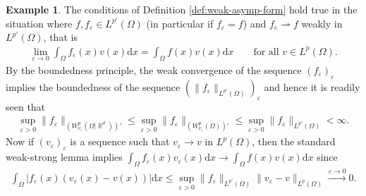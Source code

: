 \documentclass[12pt, reqno]{amsart}%
\theoremstyle{plain}  %
\theoremstyle{definition}  %
\newtheorem{example}[theorem]{Example}
\numberwithin{equation}{section}
\DeclareMathOperator{\R}{\mathbb{R}}
\renewcommand{\d}{\mathrm{d}}
\newcommand{\eps}{\varepsilon}
\begin{document}
\begin{example}
The conditions of Definition \ref{def:weak-asymp-form}  hold true  in the situation where  $f,f_\eps\in L^{p'} (\Omega)$ (in particular if $f_\eps=f$) and
$f_\eps \rightharpoonup f$ weakly in $L^{p'}(\Omega)$, that is
\begin{align*}
\lim_{\eps\to0} \int_{\Omega}f_\eps(x) v(x)\d x
= \int_{ \Omega}f (x)v(x)\d x\qquad\text{for all $v\in L^{p}(\Omega)$}.
\end{align*}
By the boundedness principle, the weak convergence of the sequence $(f_\eps)_\eps$ implies the boundedness of the sequence $(\| f_\eps\|_{L^{p'}(\Omega)})_\eps$ and hence it is readily seen that
\begin{align*}
\sup_{\eps>0}  \| f_\eps\|_{(W^p_{\nu_\eps}(\Omega|\R^d))'}\leq \sup_{\eps>0} \| f_\eps\|_{(W^p_{\nu_\eps}(\Omega))'}\leq
\sup_{\eps>0}  \| f_\eps\|_{L^{p'}(\Omega)}<\infty.
\end{align*}
Now if $(v_\eps)_\eps$  is a sequence such that $v_\eps \to v$ in $L^p(\Omega)$, then  the standard weak-strong lemma implies $\int_{\Omega}f_\eps(x) v_\eps (x)\d x
\to \int_{ \Omega}f (x)v(x)\d x$ since
\begin{align*}
 \int_{\Omega}|f_\eps(x) (v_\eps (x)-v(x))|\d x
 \leq  \sup_{\eps>0}  \| f_\eps\|_{L^{p'}(\Omega)} \|v_\eps-v\|_{L^p(\Omega)}\xrightarrow{\eps\to0}0.
\end{align*}
\end{example}
\end{document}
